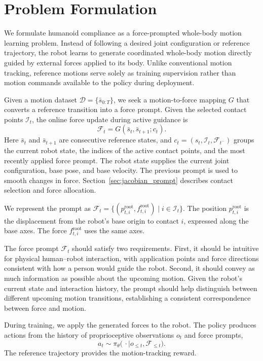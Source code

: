\section{Problem Formulation}
\label{sec:problem_formulation}

We formulate humanoid compliance as a force-prompted whole-body motion learning problem. Instead of following a desired joint configuration or reference trajectory, the robot learns to generate coordinated whole-body motion directly guided by external forces applied to its body. Unlike conventional motion tracking, reference motions serve solely as training supervision rather than motion commands available to the policy during deployment.

Given a motion dataset $\mathcal{D}=\{\bar{s}_{0:T}\}$, we seek a motion-to-force mapping $G$ that converts a reference transition into a force prompt. Given the selected contact points $\mathcal I_t$, the online force update during active guidance is
\begin{equation}
    \mathcal{F}_t = G(\bar{s}_t,\bar{s}_{t+1};c_t).
    \label{eq:motion_to_force}
\end{equation}
Here $\bar{s}_t$ and $\bar{s}_{t+1}$ are consecutive reference states, and $c_t=(s_t,\mathcal I_t,\mathcal F_{t^-})$ groups the current robot state, the indices of the active contact points, and the most recently applied force prompt. The robot state supplies the current joint configuration, base pose, and base velocity. The previous prompt is used to smooth changes in force. Section~\ref{sec:jacobian_prompt} describes contact selection and force allocation.

We represent the prompt as $\mathcal F_t=\{(p_{t,i}^{\mathrm{root}},f_{t,i}^{\mathrm{root}})\mid i\in\mathcal I_t\}$. The position $p_{t,i}^{\mathrm{root}}$ is the displacement from the robot's base origin to contact $i$, expressed along the base axes. The force $f_{t,i}^{\mathrm{root}}$ uses the same axes.

The force prompt $\mathcal{F}_t$ should satisfy two requirements. First, it should be intuitive for physical human--robot interaction, with application points and force directions consistent with how a person would guide the robot. Second, it should convey as much information as possible about the upcoming motion. Given the robot's current state and interaction history, the prompt should help distinguish between different upcoming motion transitions, establishing a consistent correspondence between force and motion.

During training, we apply the generated forces to the robot. The policy produces actions from the history of proprioceptive observations $o_t$ and force prompts,
\begin{equation}
    a_t\sim\pi_\theta\bigl(\,\cdot\mid
    o_{\leq t},\mathcal{F}_{\leq t}\bigr).
    \label{eq:force_policy}
\end{equation}
The reference trajectory provides the motion-tracking reward.
